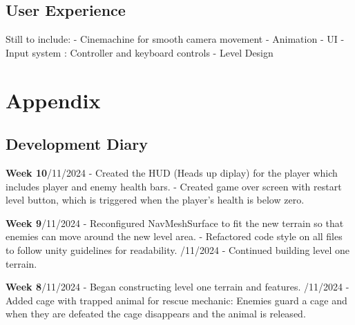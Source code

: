 \documentclass[]{final_report}
\begin{document}
\section{User Experience}
Still to include: \newline
- Cinemachine for smooth camera movement \newline
- Animation \newline
- UI \newline
- Input system : Controller and keyboard controls \newline
- Level Design

\appendix
\chapter{Appendix}

\section{Development Diary}
\textbf{Week 10}/11/2024
\newline- Created the HUD (Heads up diplay) for the player which includes player and enemy health bars.
\newline- Created game over screen with restart level button, which is triggered when the player's health is below zero.
 
\textbf{Week 9}/11/2024
\newline- Reconfigured NavMeshSurface to fit the new terrain so that enemies can move around the new level area.
\newline- Refactored code style on all files to follow unity guidelines for readability.
/11/2024
\newline- Continued building level one terrain.

\textbf{Week 8}/11/2024
\newline- Began constructing level one terrain and features.
/11/2024
\newline- Added cage with trapped animal for rescue mechanic: Enemies guard a cage and when they are defeated the cage disappears and the animal is released.
\end{document}
